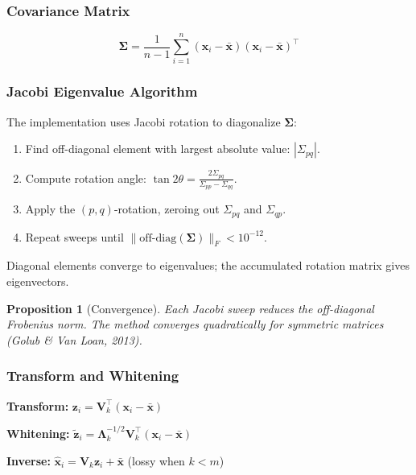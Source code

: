 \documentclass[11pt,a4paper]{article}
\newtheorem{proposition}[theorem]{Proposition}
\theoremstyle{definition}
\theoremstyle{remark}
\begin{document}
\subsubsection*{Covariance Matrix}
\begin{equation}
\boldsymbol{\Sigma} = \frac{1}{n-1}\sum_{i=1}^n (\mathbf{x}_i - \bar{\mathbf{x}})(\mathbf{x}_i - \bar{\mathbf{x}})^\top
\end{equation}

\subsubsection*{Jacobi Eigenvalue Algorithm}

The implementation uses Jacobi rotation to diagonalize $\boldsymbol{\Sigma}$:

\begin{enumerate}[label=\arabic*., itemsep=0pt]
\item Find off-diagonal element with largest absolute value: $|\Sigma_{pq}|$.
\item Compute rotation angle: $\tan 2\theta = \frac{2\Sigma_{pq}}{\Sigma_{pp} - \Sigma_{qq}}$.
\item Apply the $(p,q)$-rotation, zeroing out $\Sigma_{pq}$ and $\Sigma_{qp}$.
\item Repeat sweeps until $\|\mathrm{off\text{-}diag}(\boldsymbol{\Sigma})\|_F < 10^{-12}$.
\end{enumerate}

Diagonal elements converge to eigenvalues; the accumulated rotation matrix gives eigenvectors.

\begin{proposition}[Convergence]
Each Jacobi sweep reduces the off-diagonal Frobenius norm. The method converges quadratically for symmetric matrices (Golub \& Van Loan, 2013).
\end{proposition}

\subsubsection*{Transform and Whitening}

\textbf{Transform:} $\mathbf{z}_i = \mathbf{V}_k^\top(\mathbf{x}_i - \bar{\mathbf{x}})$

\textbf{Whitening:} $\tilde{\mathbf{z}}_i = \boldsymbol{\Lambda}_k^{-1/2}\mathbf{V}_k^\top(\mathbf{x}_i - \bar{\mathbf{x}})$

\textbf{Inverse:} $\hat{\mathbf{x}}_i = \mathbf{V}_k\mathbf{z}_i + \bar{\mathbf{x}}$ (lossy when $k < m$)
\end{document}
